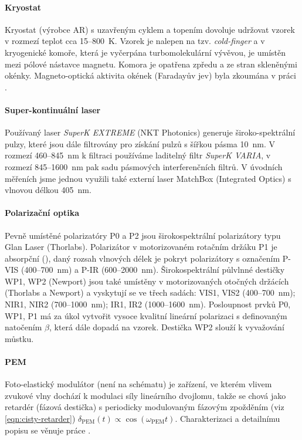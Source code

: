 \paragraph{Kryostat}
Kryostat (výrobce AR) s uzavřeným cyklem a topením dovoluje udržovat vzorek v rozmezí teplot cca 15--\SI{800}{\kelvin}.
Vzorek je nalepen na tzv. \emph{cold-finger} a v kryogenické komoře, která je vyčerpána turbomolekulární vývěvou, je umístěn mezi pólové nástavce magnetu.
Komora je opatřena zpředu a ze stran skleněnými okénky.
Magneto-optická aktivita okének (Faradayův jev) byla zkoumána v práci \cite{baduraMagnetooptickaMereniPro2019}.

\paragraph{Super-kontinuální laser}
Používaný laser \emph{SuperK EXTREME} (NKT Photonics) generuje široko-spektrální pulzy, které jsou dále filtrovány pro získání pulzů s šířkou pásma \SI{10}{\nano\meter}.
V rozmezí \num{460}--\SI{845}{\nano\meter} k filtraci používáme laditelný filtr \emph{SuperK VARIA}, v rozmezí \num{845}--\SI{1600}{\nano\meter} pak sadu pásmových interferenčních filtrů.
V úvodních měřeních jsme jednou využili také externí laser MatchBox (Integrated Optics) s vlnovou délkou \SI{405}{\nano\meter}.

\paragraph{Polarizační optika}
Pevně umístěné polarizatóry P0 a P2 jsou širokospektrální polarizátory typu Glan Laser (Thorlabs).
Polarizátor v motorizovaném rotačním držáku P1 je absorpční (), daný rozsah vlnových délek je pokryt polarizátory s označením P-VIS (\num{400}--\SI{700}{\nano\meter}) a P-IR (\num{600}--\SI{2000}{\nano\meter}).
Širokospektrální půlvlnné destičky WP1, WP2 (Newport) jsou také umístěny v motorizovaných otočných držácích (Thorlabs a Newport) a vyskytují se ve třech sadách: VIS1, VIS2 (\num{400}--\SI{700}{\nano\meter}); NIR1, NIR2 (\num{700}--\SI{1000}{\nano\meter}); IR1, IR2 (\num{1000}--\SI{1600}{\nano\meter}).
Posloupnost prvků P0, WP1, P1 má za úkol vytvořit vysoce kvalitní lineární polarizaci s definovaným natočením $\beta$, která dále dopadá na vzorek.
Destička WP2 slouží k vyvažování můstku.

\paragraph{PEM}
Foto-elastický modulátor (není na schématu) je zařízení, ve kterém vlivem zvukové vlny dochází k modulaci síly lineárního dvojlomu,
takže se chová jako retardér (fázová destička) s periodicky modulovaným fázovým zpožděním (viz \eqref{eqn:cisty-retarder}) $\delta_\textrm{PEM}(t) \propto \cos(\omega_\textrm{PEM}t)$. 
Charakterizaci a detailnímu popisu se věnuje práce \cite{minarModulacePolarizaceSvetelne2004}.

